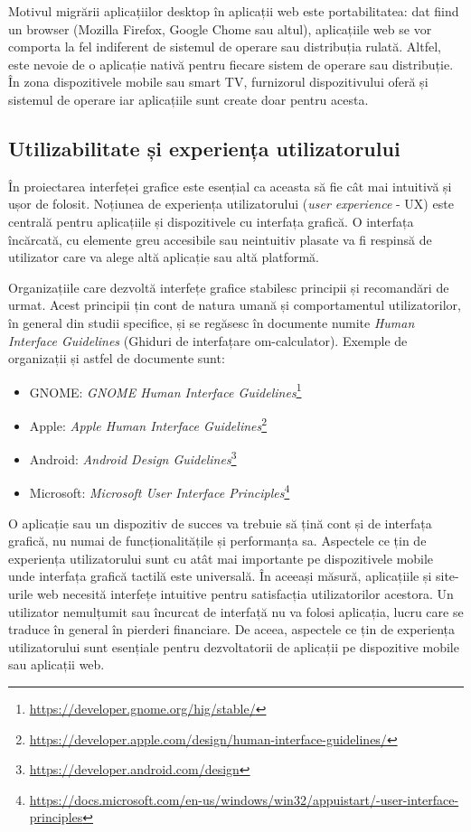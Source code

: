 Motivul migrării aplicațiilor desktop în aplicații web este portabilitatea: dat fiind un browser (Mozilla Firefox, Google Chome sau altul), aplicațiile web se vor comporta la fel indiferent de sistemul de operare sau distribuția rulată. Altfel, este nevoie de o aplicație nativă pentru fiecare sistem de operare sau distribuție. În zona dispozitivele mobile sau smart TV, furnizorul dispozitivului oferă și sistemul de operare iar aplicațiile sunt create doar pentru acesta.

\subsection{Utilizabilitate și experiența utilizatorului}
\label{sec:ui:ux}

În proiectarea interfeței grafice este esențial ca aceasta să fie cât mai intuitivă și ușor de folosit. Noțiunea de experiența utilizatorului (\textit{user experience} - UX) este centrală pentru aplicațiile și dispozitivele cu interfața grafică. O interfața încărcată, cu elemente greu accesibile sau neintuitiv plasate va fi respinsă de utilizator care va alege altă aplicație sau altă platformă.

Organizațiile care dezvoltă interfețe grafice stabilesc principii și recomandări de urmat. Acest principii țin cont de natura umană și comportamentul utilizatorilor, în general din studii specifice, și se regăsesc în documente numite \textit{Human Interface Guidelines} (Ghiduri de interfațare om-calculator). Exemple de organizații și astfel de documente sunt:

\begin{itemize}
  \item GNOME: \textit{GNOME Human Interface Guidelines}\footnote{\url{https://developer.gnome.org/hig/stable/}}
  \item Apple: \textit{Apple Human Interface Guidelines}\footnote{\url{https://developer.apple.com/design/human-interface-guidelines/}}
  \item Android: \textit{Android Design Guidelines}\footnote{\url{https://developer.android.com/design}}
  \item Microsoft: \textit{Microsoft User Interface Principles}\footnote{\url{https://docs.microsoft.com/en-us/windows/win32/appuistart/-user-interface-principles}}
\end{itemize}

O aplicație sau un dispozitiv de succes va trebuie să țină cont și de interfața grafică, nu numai de funcționalitățile și performanța sa. Aspectele ce țin de experiența utilizatorului sunt cu atât mai importante pe dispozitivele mobile unde interfața grafică tactilă este universală. În aceeași măsură, aplicațiile și site-urile web necesită interfețe intuitive pentru satisfacția utilizatorilor acestora. Un utilizator nemulțumit sau încurcat de interfață nu va folosi aplicația, lucru care se traduce în general în pierderi financiare. De aceea, aspectele ce țin de experiența utilizatorului sunt esențiale pentru dezvoltatorii de aplicații pe dispozitive mobile sau aplicații web.

